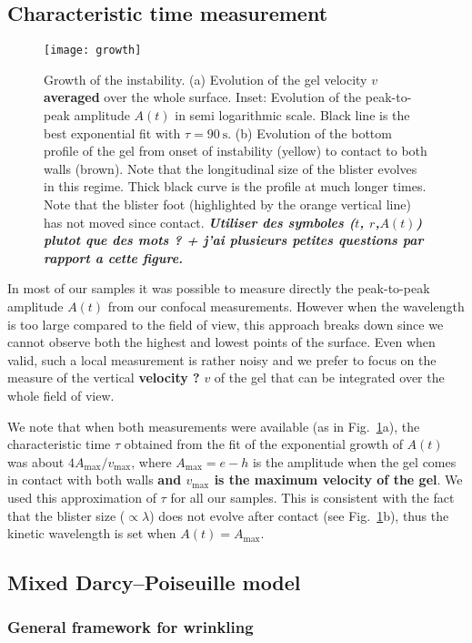 \documentclass[twocolumn,superscriptaddress,showpacs,preprintnumbers,
amsmath,amssymb,prl]{revtex4-1}
\newcommand{\seb}[1]{\textbf{\color{blue}#1}} %
\begin{document}
\subsection*{Characteristic time measurement}
\begin{figure}
	\texttt{[image: growth]}
	\caption{Growth of the instability. (a) Evolution of the gel velocity $v$ \seb{averaged} over the whole surface. Inset: Evolution of the peak-to-peak amplitude $A(t)$ in semi logarithmic scale. Black line is the best exponential fit with $\tau=\SI{90}{\second}$. (b) Evolution of the bottom profile of the gel from onset of instability (yellow) to contact to both walls (brown). Note that the longitudinal size of the blister evolves in this regime. Thick black curve is the profile at much longer times. Note that the blister foot (highlighted by the orange vertical line) has not moved since contact. \seb{\it Utiliser des symboles ($t$, $r$,$ A(t)$) plutot que des mots ? + j'ai plusieurs petites questions par rapport a cette figure.}}
	\label{fig:growth}
\end{figure}

In most of our samples it was possible to measure directly the peak-to-peak amplitude $A(t)$ from our confocal measurements. However when the wavelength is too large compared to the field of view, this approach breaks down since we cannot observe both the highest and lowest points of the surface. Even when valid, such a local measurement is rather noisy and we prefer to focus on the measure of the vertical \seb{velocity ?} $v$ of the gel that can be integrated over the whole field of view.

We note that when both measurements were available (as in Fig.~\ref{fig:growth}a), the characteristic time $\tau$ obtained from the fit of the exponential growth of $A(t)$ was about $4A_\text{max}/v_\text{max}$, where $A_\text{max} = e-h$ is the amplitude when the gel comes in contact with both walls \seb{and $v_\text{max}$ is the maximum velocity of the gel}. We used this approximation of $\tau$ for all our samples. This is consistent with the fact that the blister size ($\propto\lambda$) does not evolve after contact (see Fig.~\ref{fig:growth}b), thus the kinetic wavelength is set when $A(t) = A_\text{max}$.

\subsection*{Mixed Darcy--Poiseuille model}

\subsubsection*{General framework for wrinkling}
\end{document}
